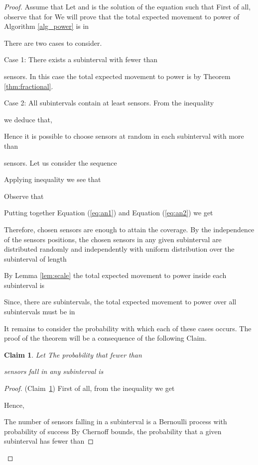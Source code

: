 \documentclass[final,5p,times,twocolumn]{elsarticle_mod}
\newtheorem{Claim}[theorem]{Claim}
\begin{document}
\begin{proof} Assume that 
Let  and   
 is the solution of the equation  such that 
First of all, observe that  for 
We will prove that the total expected movement to power  of Algorithm \ref{alg_power}
is in 

There are two cases to consider.

Case 1: There exists a subinterval with fewer than 

sensors. In this case the total expected movement to power  is 
 by Theorem \ref{thm:fractional}.

Case 2:  All subintervals contain at least  sensors. From the inequality 

we deduce that, 

Hence it is possible to choose  sensors at random in each subinterval
with more than 

sensors. 
Let us consider the sequence

Applying inequality  we see that

Observe that


Putting together Equation (\ref{eq:an1}) and Equation (\ref{eq:an2}) we get

Therefore,  
chosen sensors are enough to attain the coverage.
By the independence of the sensors positions, the  
chosen sensors in any given subinterval are distributed randomly and independently with uniform distribution over the subinterval of length

By Lemma \ref{lem:scale} the total expected movement to power  inside each subinterval is 

Since, there are  subintervals, the total expected movement to power  over all subintervals must be in


It remains to consider the probability with which each of these cases occurs. The proof of the theorem will be a consequence of the following Claim.
\begin{Claim}
\label{claim:first}
Let 
 The probability that fewer than 
  
sensors fall in any subinterval is
 
\end{Claim}
\begin{proof} (Claim~\ref{claim:first})
First of all, from the inequality  we get
 
Hence,

The number of sensors falling in a subinterval is a Bernoulli process with probability of success  By Chernoff bounds, the probability
that a given subinterval has fewer than 
 

\end{proof}
\end{proof}
\end{document}
